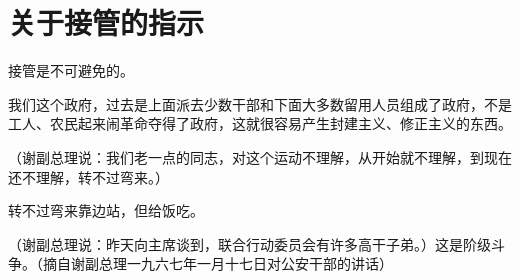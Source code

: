 \section[关于接管的指示（一九六七年一月）]{关于接管的指示}


接管是不可避免的。

我们这个政府，过去是上面派去少数干部和下面大多数留用人员组成了政府，不是工人、农民起来闹革命夺得了政府，这就很容易产生封建主义、修正主义的东西。

（谢副总理说：我们老一点的同志，对这个运动不理解，从开始就不理解，到现在还不理解，转不过弯来。）

转不过弯来靠边站，但给饭吃。

（谢副总理说：昨天向主席谈到，联合行动委员会有许多高干子弟。）这是阶级斗争。（摘自谢副总理一九六七年一月十七日对公安干部的讲话）

